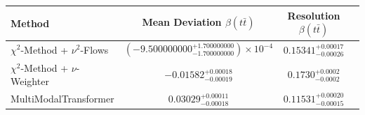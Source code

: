     \begin{tabular}{lccc}
        \toprule
        Method & Mean Deviation $\beta(t\bar{t})$ & Resolution $\beta(t\bar{t})$ \\
        \midrule
        $\chi^2$-Method + $\nu^2$-Flows & $(-9.500000000^{+1.700000000}_{-1.700000000})\times 10^{-4}$ & $0.15341^{+0.00017}_{-0.00026}$ \\
        $\chi^2$-Method + $\nu$-Weighter & $-0.01582^{+0.00018}_{-0.00019}$ & $0.1730^{+0.0002}_{-0.0002}$ \\
        MultiModalTransformer & $0.03029^{+0.00011}_{-0.00018}$ & $0.11531^{+0.00020}_{-0.00015}$ \\
        \bottomrule
    \end{tabular}